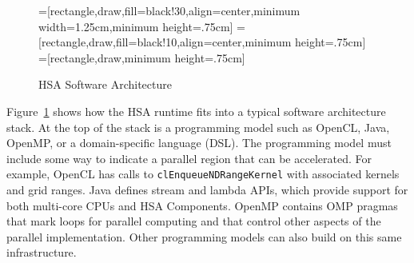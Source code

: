 \documentclass[final]{book}
\begin{document}
\begin{figure}
  \centering
  =[rectangle,draw,fill=black!30,align=center,minimum width=1.25cm,minimum height=.75cm]
  =[rectangle,draw,fill=black!10,align=center,minimum height=.75cm]
  =[rectangle,draw,minimum height=.75cm]
  \caption{HSA Software Architecture}
  \label{fig:swarch}
\end{figure}

Figure~\ref{fig:swarch} shows how the HSA runtime fits into a typical software
architecture stack. At the top of the stack is a programming model such as
OpenCL\texttrademark, Java, OpenMP, or a domain-specific language (DSL). The
programming model must include some way to indicate a parallel region that can
be accelerated. For example, OpenCL has calls to \texttt{clEnqueueNDRangeKernel}
with associated kernels and grid ranges. Java defines stream and lambda APIs,
which provide support for both multi-core CPUs and HSA Components. OpenMP
contains OMP pragmas that mark loops for parallel computing and that control
other aspects of the parallel implementation. Other programming models can also
build on this same infrastructure.
\end{document}
